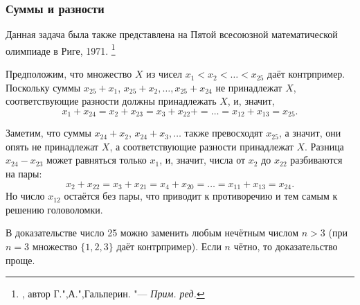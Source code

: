 \documentclass[twoside]{book}
\begin{document}
\subsubsection*{Суммы и разности}%

Данная задача была также представлена на Пятой всесоюзной математической олимпиаде в Риге, 1971.%
\footnote{\cite[№153]{ВсМО}, автор  Г.",А.",Гальперин. "--- \emph{Прим. ред.}}

\medskip



Предположим, что множество $X$ из чисел $x_1 < x_2 < \ldots < x_{25}$ даёт контрпример.
Поскольку суммы $x_{25} + x_1$, $x_{25} + x_2,\dots, x_{25} + x_{24}$ не принадлежат $X$,
соответствующие разности должны принадлежать $X$,
и, значит,
\[x_1 + x_{24} = x_2 + x_{23} = x_3 + x_{22} + =\ldots = x_{12} + x_{13} = x_{25}.\]

Заметим, что суммы $x_{24} + x_2$, $x_{24} + x_3,\dots$ также превосходят $x_{25}$,
а значит, они опять не принадлежат $X$, а соответствующие разности принадлежат $X$.
Разница $x_{24} - x_{23}$ может равняться только $x_1$, и, значит, числа от $x_2$ до $x_{22}$ разбиваются на пары: 
\[x_2 + x_{22} = x_3 + x_{21} = x_4 + x_{20} =\ldots= x_{11} + x_{13} = x_{24}.\]
Но число $x_{12}$ остаётся без пары, что приводит к противоречию и тем самым к решению головоломки.
\heart


В доказательстве число 25 можно заменить любым нечётным числом $n> 3$ (при $n=3$ множество $\{1,2,3\}$ даёт контрпример).
Если $n$ чётно, то доказательство проще. 
\end{document}
